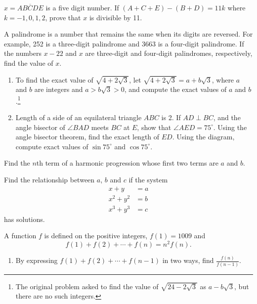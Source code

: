 \begin{problems}
    \problem $x = \overline{ABCDE}$ is a five digit number. If $(A + C + E) -
    (B + D) = 11k$ where $k = -1, 0, 1, 2$, prove that $x$ is divisible by 11. 
    
    \problem A palindrome is a number that remains the same when its digits are
    reversed. For example, 252 is a three-digit palindrome and 3663 is a
    four-digit palindrome. If the numbers $x - 22$ and $x$ are three-digit and
    four-digit palindromes, respectively, find the value of $x$.
    
    \problem[fixed]
    \begin{enumerate}
        \item To find the exact value of $\sqrt{4 + 2\sqrt{3}}$, let $\sqrt{4 +
            2\sqrt{3}} = a + b\sqrt{3}$, where $a$ and $b$ are integers and $a
            > b\sqrt{3} > 0$, and compute the exact values of $a$ and
            $b$.\footnote{The original problem asked to find the value of
            $\sqrt{24 - 2\sqrt{3}}$ as $a - b\sqrt{3}$, but there are no such
            integers.}

        \item Length of a side of an equilateral triangle $ABC$ is 2. If $AD
            \perp BC$, and the angle bisector of $\angle BAD$ meets $BC$ at
            $E$, show that $\angle AED = 75^\circ$. Using the angle bisector
            theorem, find the exact length of $ED$. Using the diagram, compute
            exact values of $\sin 75^\circ$ and $\cos 75^\circ$.
    \end{enumerate}
    
    \problem Find the $n$th term of a harmonic progression whose first two
    terms are $a$ and $b$. 
    
    \problem Find the relationship between $a$, $b$ and $c$ if the system 
    \begin{align*}
        x + y &= a\\
        x^2 + y^2 &= b\\
        x^3 + y^3 &= c
    \end{align*}
    has solutions. 
    
    \problem A function $f$ is defined on the positive integers, $f(1) = 1009$
    and 
    \[f(1) + f(2) + \cdots + f(n) = n^2 f(n).\]
    \begin{enumerate}
        \item By expressing $f(1) + f(2) + \cdots + f(n - 1)$ in two ways, find
            $\frac{f(n)}{f(n - 1)}$. 
        

\end{enumerate}
\end{problems}
